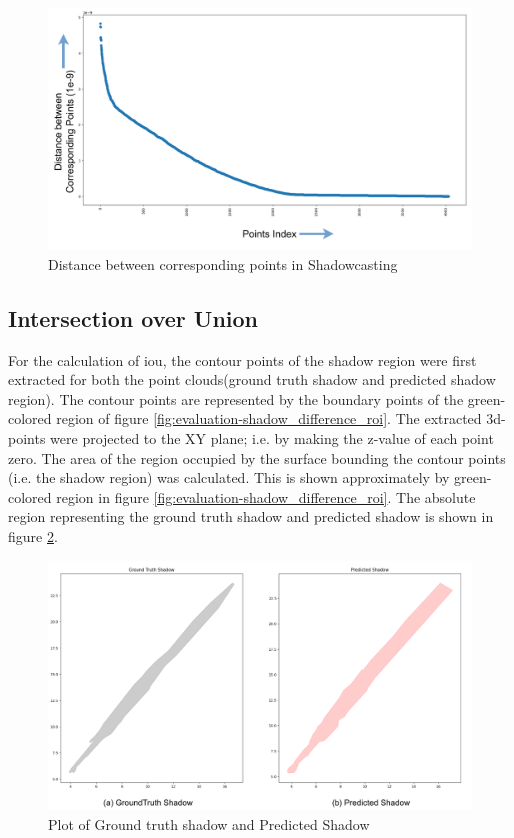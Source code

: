 \begin{figure}[htbp]
    \centering
    \includegraphics[width=1\linewidth]{97_graphics//evaluation/distn_betn_corresponding_points_in_shadowcasting.pdf}
    \caption{Distance between corresponding points in Shadowcasting}
    \label{fig:evaluation-distn_betn_corresponding_points_in_shadowcasting}
\end{figure}

\subsection{Intersection over Union}
For the calculation of \acrfull{iou}, the contour points of the shadow region were first extracted for both the point clouds(ground truth shadow and predicted shadow region). The contour points are represented by the boundary points of the green-colored region of figure \ref{fig:evaluation-shadow_difference_roi}. The extracted 3d-points were projected to the XY plane; i.e. by making the z-value of each point zero. The area of the region occupied by the surface bounding the contour points (i.e. the shadow region) was calculated. This is shown approximately by green-colored region in figure \ref{fig:evaluation-shadow_difference_roi}. The absolute region representing the ground truth shadow and predicted shadow is shown in figure \ref{fig:evaluation-shadow_gt_pred}.
\begin{figure}[htbp]
    \centering
    \includegraphics[width=1\linewidth]{97_graphics//evaluation/shadow_gt_pred.pdf}
    \caption{Plot of Ground truth shadow and Predicted Shadow}
    \label{fig:evaluation-shadow_gt_pred}
\end{figure}

